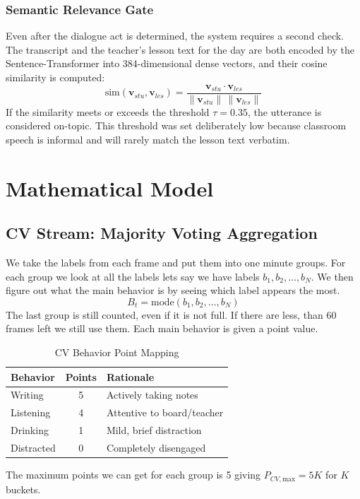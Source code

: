 \documentclass[conference]{IEEEtran}
\begin{document}
\subsubsection{Semantic Relevance Gate}
Even after the dialogue act is determined, the system requires a second check. The transcript and the teacher's lesson text for the day are both encoded by the Sentence-Transformer into 384-dimensional dense vectors, and their cosine similarity is computed:
\begin{equation}
\text{sim}(\mathbf{v}_{stu}, \mathbf{v}_{les}) = \frac{\mathbf{v}_{stu} \cdot \mathbf{v}_{les}}{\|\mathbf{v}_{stu}\| \, \|\mathbf{v}_{les}\|}
\label{eq:cosine}
\end{equation}
If the similarity meets or exceeds the threshold $\tau = 0.35$, the utterance is considered on-topic. This threshold was set deliberately low because classroom speech is informal and will rarely match the lesson text verbatim.
\section{Mathematical Model}
\subsection{CV Stream: Majority Voting Aggregation}
We take the labels from each frame and put them into one minute groups. For each group we look at all the labels lets say we have labels $b_1, b_2, \ldots, b_N$. We then figure out what the main behavior is by seeing which label appears the most.
\begin{equation}
B_t = \text{mode}(b_1, b_2, \ldots, b_N)
\label{eq:mode}
\end{equation}
The last group is still counted, even if it is not full. If there are less, than 60 frames left we still use them. Each main behavior is given a point value.
\begin{table}[htbp]
\caption{CV Behavior Point Mapping}
\begin{center}
\begin{tabular}{|l|c|l|}
\hline
\textbf{Behavior} & \textbf{Points} & \textbf{Rationale} \\
\hline
Writing & 5 & Actively taking notes \\
Listening & 4 & Attentive to board/teacher \\
Drinking & 1 & Mild, brief distraction \\
Distracted & 0 & Completely disengaged \\
\hline
\end{tabular}
\label{tab:cv_points}
\end{center}
\end{table}
The maximum points we can get for each group is 5 giving $P_{CV,\text{max}} = 5K$ for $K$ buckets.
\end{document}
